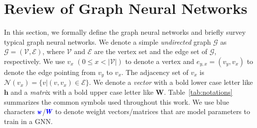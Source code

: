 \section{Review of Graph Neural Networks}
\label{sec:review_of_gnns}

In this section, we formally define the graph neural networks and briefly survey typical graph neural networks.
%
We denote a simple \emph{undirected} graph $\mathcal{G}$ as $\mathcal{G}=(\mathcal{V}, \mathcal{E})$, where $\mathcal{V}$ and $\mathcal{E}$ are the vertex set and the edge set of $\mathcal{G}$, respectively.
%
We use $v_x$ $(0 \leq x < |\mathcal{V}|)$ to denote a vertex and $e_{y,x}=(v_y, v_x)$ to denote the edge pointing from $v_y$ to $v_x$.
%
The adjacency set of $v_x$ is $\mathcal{N}(v_x)=\{v|(v, v_x) \in \mathcal{E}\}$.
%
We denote a \emph{vector} with a bold lower case letter like $\boldsymbol{h}$ and a \emph{matri}x with a bold upper case letter like $\boldsymbol{W}$.
%
Table~\ref{tab:notations} summarizes the common symbols used throughout this work.
%
We use blue characters $\textcolor{blue}{\boldsymbol{w}}$/$\textcolor{blue}{\boldsymbol{W}}$ to denote weight vectors/matrices that are model parameters to train in a GNN.

